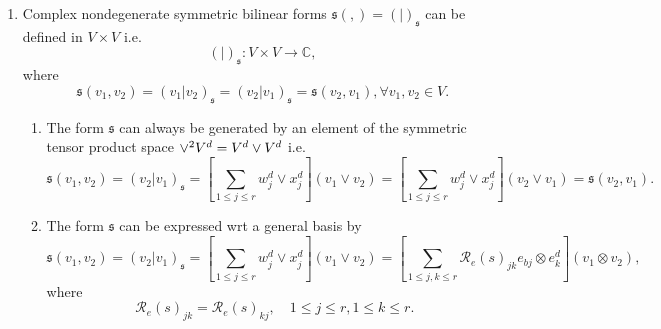 \documentclass[aps,preprint]{revtex4}%
\begin{document}
\begin{enumerate}
\begin{enumerate}
\item
\begin{equation}
\mathfrak{i}_{e}=\sum_{1\leq j,k\leq r}\mathcal{R}_{e}\left(  \mathfrak{i}%
_{e}\right)  _{jk}e_{bj}\otimes e_{k}^{d}=\sum_{1\leq j,k\leq r}%
\mathcal{\delta}_{jk}e_{bj}\otimes e_{k}^{d}=\sum_{1\leq j\leq r}e_{bj}\otimes
e_{bj}.
\end{equation}

\end{enumerate}

\item Complex nondegenerate symmetric bilinear forms $\mathfrak{s}\left(
,\right)  =\left(  \left.  {}\right\vert \left.  {}\right.  \right)
_{\mathfrak{s}}$ can be defined in $V\times V$ i.e.
\begin{equation}
\left(  \left.  {}\right\vert \left.  {}\right.  \right)  _{\mathfrak{s}%
}:V\times V\rightarrow\mathbb{C},
\end{equation}
where
\begin{equation}
\mathfrak{s}\left(  v_{1},v_{2}\right)  =\left(  \left.  v_{1}\right\vert
v_{2}\right)  _{\mathfrak{s}}=\left(  \left.  v_{2}\right\vert v_{1}\right)
_{\mathfrak{s}}=\mathfrak{s}\left(  v_{2},v_{1}\right)  ,\forall v_{1}%
,v_{2}\in V.
\end{equation}


\begin{enumerate}
\item The form $\mathfrak{s}$ can always be generated by an element of the
symmetric tensor product space ${\Large \vee}^{2}V^{d}=V^{d}\vee V^{d}$ i.e.
\begin{equation}
\mathfrak{s}\left(  v_{1},v_{2}\right)  =\left(  \left.  v_{2}\right\vert
v_{1}\right)  _{\mathfrak{s}}=\left[  \sum_{1\leq j\leq r}w_{j}^{d}\vee
x_{j}^{d}\right]  \left(  v_{1}\vee v_{2}\right)  =\left[  \sum_{1\leq j\leq
r}w_{j}^{d}\vee x_{j}^{d}\right]  \left(  v_{2}\vee v_{1}\right)
=\mathfrak{s}\left(  v_{2},v_{1}\right)  .
\end{equation}


\item The form $\mathfrak{s}$ can be expressed wrt a general basis by%
\begin{equation}
\mathfrak{s}\left(  v_{1},v_{2}\right)  =\left(  \left.  v_{2}\right\vert
v_{1}\right)  _{\mathfrak{s}}=\left[  \sum_{1\leq j\leq r}w_{j}^{d}\vee
x_{j}^{d}\right]  \left(  v_{1}\vee v_{2}\right)  =\left[  \sum_{1\leq j,k\leq
r}\mathcal{R}_{e}\left(  s\right)  _{jk}e_{bj}\otimes e_{k}^{d}\right]
\left(  v_{1}\otimes v_{2}\right)  ,
\end{equation}
where
\begin{equation}
\mathcal{R}_{e}\left(  s\right)  _{jk}=\mathcal{R}_{e}\left(  s\right)
_{kj},\quad1\leq j\leq r,1\leq k\leq r.
\end{equation}



\end{enumerate}
\end{enumerate}
\end{document}
